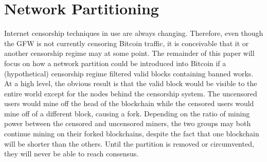 \section{Network Partitioning}
Internet censorship techniques in use are always changing. Therefore, even though the GFW is not currently censoring Bitcoin traffic, it is conceivable that it or another censorship regime may at some point. The remainder of this paper will focus on how a network partition could be introduced  into Bitcoin if a (hypothetical) censorship regime filtered valid blocks containing banned works.
At a high level, the obvious result is that the valid block would be visible to the entire world except for the nodes behind the censorship system. The uncensored users would mine off the head of the blockchain while the censored users would mine off of a different block, causing a fork.
Depending on the ratio of mining power between the censored and uncensored miners, the two groups may both continue mining on their forked blockchains, despite the fact that one blockchain will be shorter than the others. Until the partition is removed or circumvented, they will never be able to reach consensus.

